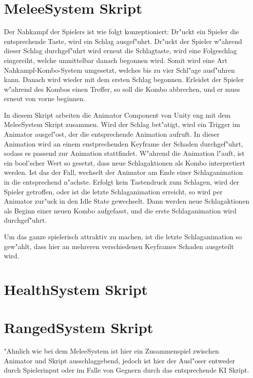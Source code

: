 \section{MeleeSystem Skript}
Der Nahkampf der Spielers ist wie folgt konzeptioniert:
Dr"uckt ein Spieler die entsprechende Taste, wird ein Schlag ausgef"uhrt. Dr"uckt der Spieler w"ahrend dieser Schlag durchgef"uhrt wird erneut die Schlagtaste, wird eine Folgeschlag eingereiht, welche unmittelbar danach begonnen wird. Somit wird eine Art Nahkampf-Kombo-System umgesetzt, welches bis zu vier Schl"age ausf"uhren kann. Danach wird wieder mit dem ersten Schlag begonnen. Erleidet der Spieler w"ahrend des Kombos einen Treffer, so soll die Kombo abbrechen, und er muss erneut von vorne beginnen.\newline

In diesem Skript arbeiten die Animator Component von Unity eng mit dem MeleeSystem Skript zusammen. Wird der Schlag bet"atigt, wird ein Trigger im Animator ausgel"ost, der die entsprechende Animation aufruft. In dieser Animation wird an einem enstprechenden Keyframe der Schaden durchgef"uhrt, sodass es passend zur Animation stattfindet. W"ahrend die Animation l"auft, ist ein bool'scher Wert so gesetzt, dass neue Schlagaktionen als Kombo interpretiert werden. Ist das der Fall, wechselt der Animator am Ende einer Schlaganimation in die entsprechend n"achste. Erfolgt kein Tastendruck zum Schlagen, wird der Spieler getroffen, oder ist die letzte Schlaganimation erreicht, so wird per Animator zur"uck in den Idle State  gewechselt. Dann werden neue Schlagaktionen als Beginn einer neuen Kombo aufgefasst, und die erste Schlaganimation wird durchgef"uhrt.\newline

Um das ganze spielerisch attraktiv zu machen, ist die letzte Schlaganimation so gew"ahlt, dass hier an mehreren verschiedenen Keyframes Schaden ausgeteilt wird.


\section{HealthSystem Skript}

\section{RangedSystem Skript}
"Ahnlich wie bei dem MeleeSystem ist hier ein Zusammenspiel zwischen Animator und Skript ausschlaggebend, jedoch ist hier der Ausl"oser entweder durch Spielerinput oder im Falle von Gegnern durch das entsprechende KI Skript.\newline

